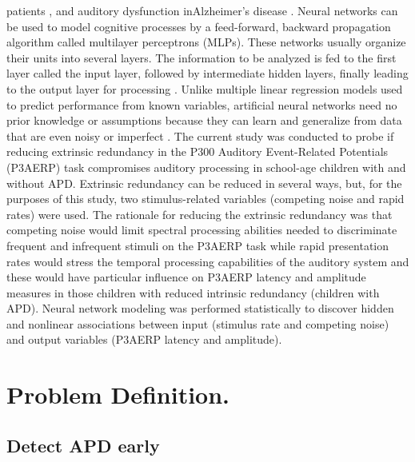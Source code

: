 \documentclass[letterpaper%
, twoside%
, 12pt%
,these%
, english%
,creativecommons,hyperref%
]{thETS}
\begin{document}
\begin{introduction}
patients \cite{Yamamura}, and auditory dysfunction inAlzheimer’s disease
\cite{Krishnamurti}. Neural networks can be used to model cognitive processes
by a feed-forward, backward propagation algorithm
called multilayer perceptrons (MLPs). These networks usually
organize their units into several layers. The information
to be analyzed is fed to the first layer called the input layer,
followed by intermediate hidden layers, finally leading to
the output layer for processing \cite{Abdi}. Unlike multiple linear
regression models used to predict performance from known
variables, artificial neural networks need no prior knowledge
or assumptions because they can learn and generalize from
data that are even noisy or imperfect \cite{Keshavarzi}.
The current study was conducted to probe if reducing
extrinsic redundancy in the P300 Auditory Event-Related Potentials (P3AERP) task compromises auditory
processing in school-age children with and without APD.
Extrinsic redundancy can be reduced in several ways, but,
for the purposes of this study, two stimulus-related variables
(competing noise and rapid rates) were used. The rationale
for reducing the extrinsic redundancy was that competing
noise would limit spectral processing abilities needed to discriminate frequent and infrequent stimuli on the P3AERP
task while rapid presentation rates would stress the temporal
processing capabilities of the auditory system and these
would have particular influence on P3AERP latency and
amplitude measures in those children with reduced intrinsic
redundancy (children with APD). Neural network modeling
was performed statistically to discover hidden and nonlinear
associations between input (stimulus rate and competing
noise) and output variables (P3AERP latency and amplitude).

\end{introduction}



\chapter{Problem Definition.}


\section{Detect APD early}
\end{document}

